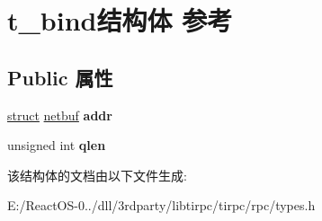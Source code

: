 \hypertarget{structt__bind}{}\section{t\+\_\+bind结构体 参考}
\label{structt__bind}
\subsection*{Public 属性}
\begin{DoxyCompactItemize}
\item 
\mbox{\label{structt__bind_a9d9772f0909dafb2e2c5f5c3dcc3e27a}} 
\hyperlink{interfacestruct}{struct} \hyperlink{structnetbuf}{netbuf} {\bfseries addr}
\item 
\mbox{\label{structt__bind_a4d9351480eacbd2ea34644aa0f966bd9}} 
unsigned int {\bfseries qlen}
\end{DoxyCompactItemize}


该结构体的文档由以下文件生成\+:\begin{DoxyCompactItemize}
\item 
E\+:/\+React\+O\+S-\/0../dll/3rdparty/libtirpc/tirpc/rpc/types.\+h\end{DoxyCompactItemize}
